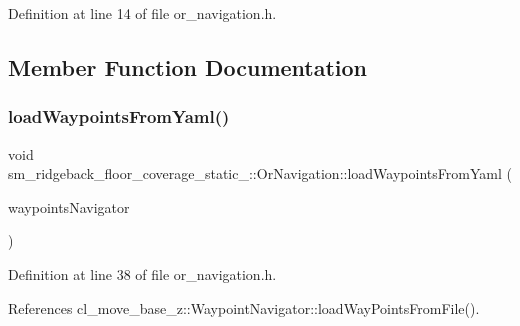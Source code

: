Definition at line 14 of file or\+\_\+navigation.\+h.



\subsection{Member Function Documentation}
\mbox{\label{classsm__ridgeback__floor__coverage__static__1_1_1OrNavigation_a32f658f3d1ed7724f13fd30eb2139bbb}} 
\subsubsection{\texorpdfstring{load\+Waypoints\+From\+Yaml()}{loadWaypointsFromYaml()}}
{\footnotesize\ttfamily void sm\+\_\+ridgeback\+\_\+floor\+\_\+coverage\+\_\+static\+\_\+::\+Or\+Navigation\+::load\+Waypoints\+From\+Yaml (\begin{DoxyParamCaption}\item[{\hyperlink{classcl__move__base__z_1_1WaypointNavigator}{Waypoint\+Navigator} $\ast$}]{waypoints\+Navigator }\end{DoxyParamCaption})\hspace{0.3cm}{\ttfamily [inline]}}



Definition at line 38 of file or\+\_\+navigation.\+h.



References cl\+\_\+move\+\_\+base\+\_\+z\+::\+Waypoint\+Navigator\+::load\+Way\+Points\+From\+File().



